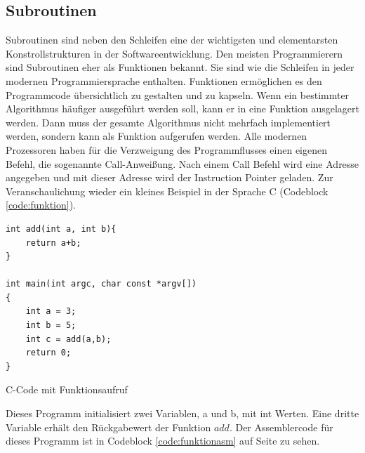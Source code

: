 \documentclass[a4paper,12pt]{article}
\begin{document}
\subsection{Subroutinen} \label{subsec:subroutinen}
Subroutinen sind neben den Schleifen eine der wichtigsten und elementarsten Konstrollstrukturen in der Softwareentwicklung. Den meisten Programmierern sind Subroutinen eher als Funktionen bekannt. Sie sind wie die Schleifen in jeder modernen Programmiersprache enthalten. Funktionen ermöglichen es den Programmcode übersichtlich zu gestalten und zu kapseln. Wenn ein bestimmter Algorithmus häufiger ausgeführt werden soll, kann er in eine Funktion ausgelagert werden. Dann muss der gesamte Algorithmus nicht mehrfach implementiert werden, sondern kann als Funktion aufgerufen werden. Alle modernen Prozessoren haben für die Verzweigung des Programmflusses einen eigenen Befehl, die sogenannte Call-Anweißung. Nach einem Call Befehl wird eine Adresse angegeben und mit dieser Adresse wird der Instruction Pointer geladen. Zur Veranschaulichung wieder ein kleines Beispiel in der Sprache C (Codeblock \ref{code:funktion}).  

\begin{code}[!htb]
\begin{lstlisting}
int add(int a, int b){
	return a+b;
}

int main(int argc, char const *argv[])
{
	int a = 3;
	int b = 5;
	int c = add(a,b); 
	return 0;
}
\end{lstlisting}
\caption[C Code Funktionen]{C-Code mit Funktionsaufruf}
\label{code:funktion}
\end{code}

\noindent Dieses Programm initialisiert zwei Variablen, a und b, mit int Werten. Eine dritte Variable erhält den Rückgabewert der Funktion $add$. Der Assemblercode für dieses Programm ist in Codeblock \ref{code:funktionasm} auf Seite \pageref{code:funktionasm} zu sehen. 
 
\end{document}
